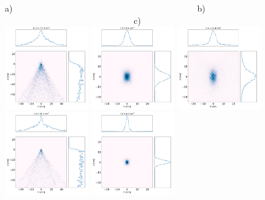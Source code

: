 \documentclass[a4paper, 11pt]{article}
\begin{document}
\begin{figure}[h]
\flushleft
a)~~~~~~~~~~~~~~~~~~~~~~~~~~~~~~~~~~~~~~~~~~~b)~~~~~~~~~~~~~~~~~~~~~~~~~~~~~~~~~~~~~~~~~~~c)\\
\centering
\includegraphics[width=0.32\textwidth]{figures/M0-2_toroid.png}
\includegraphics[width=0.32\textwidth]{figures/M0p2_diaboloid.png}
\includegraphics[width=0.32\textwidth]{figures/M0p2_parabolic-cone.png}
\includegraphics[width=0.32\textwidth]{figures/M0p1_toroid.png}
\includegraphics[width=0.32\textwidth]{figures/M0p1_diaboloid.png}

\end{figure}
\end{document}
